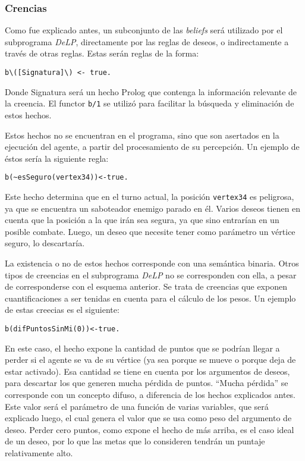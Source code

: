 \documentclass[oneside]{book}
\begin{document}
\subsubsection{Crencias}

\label{sec:creencias}

Como fue explicado antes, %
un subconjunto de las  \textit{beliefs} será utilizado por el subprograma 
\textit{DeLP}, directamente por 
las reglas de deseos, o indirectamente a través de otras reglas. Estas serán reglas de 
la forma:

\begin{verbatim}
b\([Signatura]\) <- true.
\end{verbatim}

Donde Signatura será un hecho Prolog que contenga la información relevante de la 
creencia. El functor \texttt{b/1} se utilizó para facilitar la búsqueda y 
eliminación de estos hechos. 

Estos hechos no se encuentran en el programa, sino que son asertados en la ejecución
del agente, a partir del procesamiento de su percepción. 
Un ejemplo de éstos sería la siguiente regla:

\begin{verbatim}
b(~esSeguro(vertex34))<-true.
\end{verbatim}

Este hecho determina que en el turno actual, la posición \texttt{vertex34} es peligrosa,
ya que se encuentra un saboteador enemigo parado en él. Varios deseos tienen en cuenta
que la posición a la que irán sea segura, ya que sino entrarían en un posible combate.
Luego, un deseo que necesite tener como parámetro un vértice seguro, lo descartaría.

La existencia o no de estos hechos corresponde con una semántica binaria. Otros tipos de
creencias en el subprograma \textit{DeLP} no se corresponden con ella, a pesar de corresponderse
con el esquema anterior. Se trata de creencias que exponen cuantificaciones a ser 
tenidas en cuenta para el cálculo de los pesos. Un ejemplo de estas creecias es el 
siguiente:

\begin{verbatim}
b(difPuntosSinMi(0))<-true.
\end{verbatim}

En este caso, el hecho expone la cantidad de puntos que se podrían llegar a perder si el
agente se va de su vértice (ya sea porque se mueve o porque deja de estar activado). Esa
cantidad se tiene en cuenta por los argumentos de deseos, para descartar los que generen
mucha pérdida de puntos. ``Mucha pérdida'' se corresponde con un concepto difuso, a
diferencia de los hechos explicados antes. Este valor será el parámetro de una función
de varias variables, que será explicado luego, el cual genera el valor que se usa como
peso del argumento de deseo. Perder cero puntos, como expone el hecho de más arriba, es el
caso ideal de un deseo, por lo que las metas que lo consideren tendrán un puntaje
relativamente alto.
\end{document}
